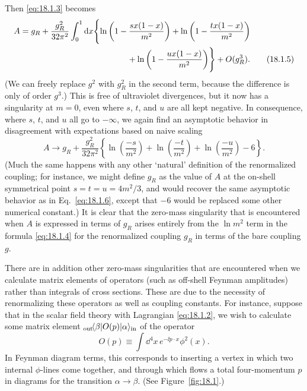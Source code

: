 Then \eqref{eq:18.1.3} becomes
\begin{align}
 A={}&g_R+\frac{g_R^2}{32\pi^2}\int_0^1\dd x\Biggl\{
 \ln\left(1-\frac{sx(1-x)}{m^2}\right)
 +\ln\left(1-\frac{tx(1-x)}{m^2}\right) \notag\\
 &\hspace{41mm}
 +\ln\left(1-\frac{ux(1-x)}{m^2}\right)\Biggr\}+O(g_R^3) .
 \tag{18.1.5}
 \label{eq:18.1.5}
\end{align}
(We can freely replace $g^2$ with $g_R^2$ in the second term, because the
difference is only of order $g^3$.) This is free of ultraviolet divergences,
but it now has a singularity at $m=0$, even where $s$, $t$, and $u$ are all
kept negative. In consequence, where $s$, $t$, and $u$ all go to $-\infty$,
we again find an asymptotic behavior in disagreement with expectations based
on naive scaling
\begin{equation}
 A\longrightarrow g_R+\frac{g_R^2}{32\pi^2}
 \left\{\ln\left(\frac{-s}{m^2}\right)
 +\ln\left(\frac{-t}{m^2}\right)
 +\ln\left(\frac{-u}{m^2}\right)-6\right\} .
 \tag{18.1.6}
 \label{eq:18.1.6}
\end{equation}
(Much the same happens with any other `natural' definition of the
renormalized coupling; for instance, we might define $g_R$ as the value of
$A$ at the on-shell symmetrical point $s=t=u=4m^2/3$, and would recover the
same asymptotic behavior as in Eq.~\eqref{eq:18.1.6}, except that $-6$ would
be replaced some other numerical constant.) It is clear that the zero-mass
singularity that is encountered when $A$ is expressed in terms of $g_R$
arises entirely from the $\ln m^2$ term in the formula \eqref{eq:18.1.4} for
the renormalized coupling $g_R$ in terms of the bare coupling $g$.

There are in addition other zero-mass singularities that are encountered when
we calculate matrix elements of operators (such as off-shell Feynman
amplitudes) rather than integrals of cross sections. These are due to the
necessity of renormalizing these operators as well as coupling constants. For
instance, suppose that in the scalar field theory with Lagrangian
\eqref{eq:18.1.2}, we wish to calculate some matrix element
${}_{\mathrm{out}}\!\langle \beta\rvert O(p)\lvert \alpha\rangle_{\mathrm{in}}$ of the operator
\begin{equation}
 O(p)\equiv\int \dd^4x\,e^{-\ii p\cdot x}\phi^2(x) .
 \tag{18.1.7}
 \label{eq:18.1.7}
\end{equation}
In Feynman diagram terms, this corresponds to inserting a vertex in which two
internal $\phi$-lines come together, and through which flows a total
four-momentum $p$ in diagrams for the transition $\alpha\to\beta$. (See
Figure~\ref{fig:18.1}.)

